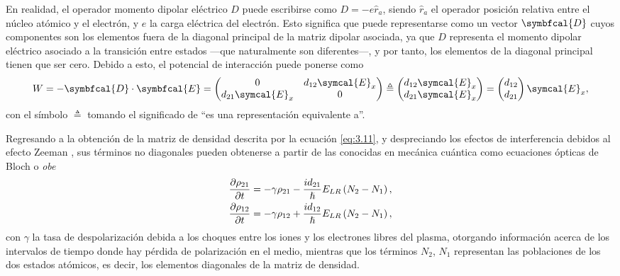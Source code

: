 En realidad, el operador momento dipolar eléctrico $D$ puede escribirse como $D = -e \hat{r}_{a}$, siendo $\hat{r}_{a}$ el operador posición relativa entre el núcleo atómico y el electrón, y $e$ la carga eléctrica del electrón. Esto significa que puede representarse como un vector $\symbfcal{D}$ cuyos componentes son los elementos fuera de la diagonal principal de la matriz dipolar asociada, ya que $D$ representa el momento dipolar eléctrico asociado a la transición entre estados ---que naturalmente son diferentes---, y por tanto, los elementos de la diagonal principal tienen que ser cero. Debido a esto, el potencial de interacción puede ponerse como
\begin{equation}
  W = -\symbfcal{D} \cdot \symbfcal{E} =  
  \begin{pmatrix}
    0 & d_{12}\symcal{E}_{x} \\
    d_{21}\symcal{E}_{x} & 0 
  \end{pmatrix} \triangleq
  \begin{pmatrix}
    d_{12}\symcal{E}_{x} \\
    d_{21}\symcal{E}_{x}
  \end{pmatrix} 
  =
  \begin{pmatrix}
    d_{12} \\
    d_{21}
  \end{pmatrix}
  \symcal{E}_{x},
\end{equation}
con el símbolo $\triangleq$ tomando el significado de \enquote{es una representación equivalente a}.

Regresando a la obtención de la matriz de densidad descrita por la ecuación \eqref{eq:3.11}, y despreciando los efectos de interferencia debidos al efecto Zeeman \autocite{Sureau1995}, sus términos no diagonales pueden obtenerse a partir de las conocidas en mecánica cuántica \autocite{Milonni1988} como ecuaciones ópticas de Bloch o \emph{\acrfull{obe}}
\begin{align}
  \label{eq:3.12a}
  \frac{\partial\rho_{21}}{\partial t} &= -\gamma \rho_{21} - \frac{id_{21}}{\hslash }E_{LR}\left(N_{2}-N_{1}\right), \\
  \label{eq:3.12b}
  \frac{\partial\rho_{12}}{\partial t} &= -\gamma \rho_{12} + \frac{id_{12}}{\hslash }E_{LR}\left(N_{2}-N_{1}\right),
\end{align}
con $\gamma$ la tasa de despolarización debida a los choques entre los iones y los electrones libres del plasma, otorgando información acerca de los intervalos de tiempo donde hay pérdida de polarización en el medio, mientras que los términos $N_{2}$, $N_{1}$ representan las poblaciones de los dos estados atómicos, es decir, los elementos diagonales de la matriz de densidad.

